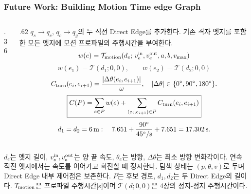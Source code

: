 \begin{frame}
\frametitle{\large Future Work: Building Motion Time edge Graph}
\begin{columns}[T,onlytextwidth]
\begin{column}{.36\textwidth}
\begin{center}


\end{center}
\end{column}
\begin{column}{.62\textwidth}
\footnotesize $q_s\to q_c$, $q_c\to q_g$의 두 직선 Direct Edge를 추가한다. 기존 격자 엣지를 포함한 모든 엣지에 모션 프로파일의 주행시간을 부여한다.
\[
w(e)=\mathcal T_{\rm motion}
       (d_e;\,v_e^{\rm in},v_e^{\rm out},a,b,v_{\max})
\]
\[
w(e_1)=\mathcal T(d_1;0,0),\qquad
w(e_2)=\mathcal T(d_2;0,0)
\]
\[
C_{\rm turn}(e_i,e_{i+1})=
\frac{|\Delta\theta(e_i,e_{i+1})|}{\omega},
\quad |\Delta\theta|\in\{0^\circ,90^\circ,180^\circ\}.
\]
\[
\boxed{C(P)=\sum_{e\in P}w(e)+
\sum_{(e_i,e_{i+1})\in P}C_{\rm turn}(e_i,e_{i+1})}
\]
\[
d_1=d_2=6\,{\rm m}:\quad
7.651+\frac{90^\circ}{45^\circ/{\rm s}}+7.651
=17.302\,{\rm s}.
\]
\end{column}
\end{columns}
\medskip
\footnotesize $d_e$는 엣지 길이, $v_e^{\rm in},v_e^{\rm out}$는 양 끝 속도, $\theta_e$는 방향, $\Delta\theta$는 최소 방향 변화각이다. 연속 직진 엣지에서는 속도를 이어가고 회전할 때 정지한다. 탐색 상태는 $(p,\theta,v)$로 두며 Direct Edge 내부 제어점은 보존한다. $P$는 후보 경로, $d_1,d_2$는 두 Direct Edge의 길이다. $\mathcal T_{\rm motion}$은 프로파일 주행시간[s]이며 $\mathcal T(d;0,0)$은 4장의 정지-정지 주행시간이다.
\end{frame}

